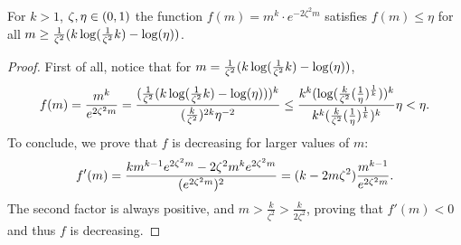         \begin{claim} \label{clm:ineq_5.13}
            For $k > 1$, $\zeta, \eta \in ( 0,1 )$ the function $f(m) = m^k \cdot e^{-2 \zeta^2 m}$ satisfies
            $f(m) \leq \eta$ for all $m \geq \frac{1}{\zeta^2}( k \log( \frac{1}{\zeta^2} k ) - \log( \eta ) )$.
            \begin{proof}
                First of all, notice that for $m = \frac{1}{\zeta^2}( k \log( \frac{1}{\zeta^2} k ) - \log( \eta ) )$,
                \[
                    f(m) = \frac{m^k}{e^{2 \zeta^2 m}}
                         = \frac{( \frac{1}{\zeta^2}( k \log( \frac{1}{\zeta^2} k ) - \log( \eta ) ) )^k}{
                            ( \frac{k}{\zeta^2} )^{2k} \eta^{-2}}
                         \leq \frac{k^k ( \log( \frac{k}{\zeta^2}( \frac{1}{\eta} )^{\frac{1}{k}} ) )^k}
                            {k^k ( \frac{k}{\zeta^2} ( \frac{1}{\eta} )^{\frac{1}{k}} )^k} \eta
                         < \eta.
                \]
                To conclude, we prove that $f$ is decreasing for larger values of $m$:
                \[
                    f'(m)
                        = \frac{k m^{k-1} e^{2 \zeta^2 m} - 2 \zeta^2 m^k e^{2 \zeta^2 m}}{( e^{2 \zeta^2 m} )^2}
                        = ( k - 2m\zeta^2 ) \frac{m^{k-1}}{e^{2 \zeta^2 m}}.
                \]
                The second factor is always positive, and $m > \frac{k}{\zeta^2} > \frac{k}{2\zeta^2}$, proving that $f'(m) < 0$
                and thus $f$ is decreasing.
            \end{proof}
        \end{claim}

